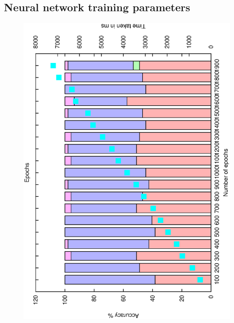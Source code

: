 \documentclass[12pt,a4,notitlepage]{report}
\renewcommand{\_}{\texttt{\symbol{95}}}
\newcommand{\<}{\texttt{\symbol{60}}}
\renewcommand{\>}{\texttt{\symbol{62}}}
\begin{document}
\subsection{Neural network training parameters}

\begin{figure}
\centering
\includegraphics[scale=0.3,angle=-90]{results/neural/n_epochs.ps}

\end{figure}
\end{document}

